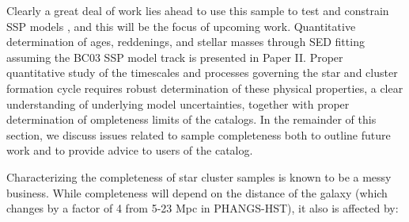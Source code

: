 \documentclass[]{aastex631}
\begin{document}
Clearly a great deal of work lies ahead to use this sample to test and constrain SSP models \citep[e.g.,][and references therein]{wofford_comprehensive_2016}, and this will be the focus of upcoming work.  Quantitative determination of ages, reddenings, and stellar masses through SED fitting assuming the BC03 SSP model track is presented in Paper II. Proper quantitative study of the timescales and processes governing the star and cluster formation cycle requires robust determination of these physical properties, a clear understanding of underlying model uncertainties, together with proper determination of  ompleteness limits of the catalogs.  In the remainder of this section, we  discuss issues related to sample completeness both to outline future work and to provide advice to users of the catalog.


Characterizing the completeness of star cluster samples is known to be a messy business. While completeness will depend on the distance of the galaxy (which changes by a factor of 4 from 5-23 Mpc in PHANGS-HST), it also is affected by:
\end{document}
